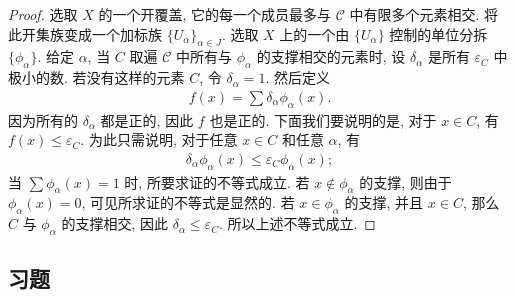 \documentclass[../../main.tex]{subfiles}
\begin{document}
\begin{proof}
选取 $X$ 的一个开覆盖, 它的每一个成员最多与 $\mathcal{C}$ 中有限多个元素相交. 将此开集族变成一个加标族 $\{U_\alpha\}_{\alpha\in J}$. 选取 $X$ 上的一个由 $\{U_\alpha\}$ 控制的单位分拆 $\{\phi_\alpha\}$. 给定 $\alpha$, 当 $C$ 取遍 $\mathcal{C}$ 中所有与 $\phi_\alpha$ 的支撑相交的元素时, 设 $\delta_\alpha$ 是所有 $\varepsilon_C$ 中极小的数. 若没有这样的元素 $C$, 令 $\delta_\alpha=1$. 然后定义
\begin{align*}
f(x)=\sum\delta_\alpha\phi_\alpha(x).
\end{align*}
因为所有的 $\delta_\alpha$ 都是正的, 因此 $f$ 也是正的. 下面我们要说明的是, 对于 $x\in C$, 有 $f(x)\leqslant\varepsilon_C$. 为此只需说明, 对于任意 $x\in C$ 和任意 $\alpha$, 有
\begin{align*}
\delta_\alpha\phi_\alpha(x)\leqslant\varepsilon_C\phi_\alpha(x);
\end{align*}
当 $\sum\phi_\alpha(x)=1$ 时, 所要求证的不等式成立. 若 $x\notin\phi_\alpha$ 的支撑, 则由于 $\phi_\alpha(x)=0$, 可见所求证的不等式是显然的. 若 $x\in\phi_\alpha$ 的支撑, 并且 $x\in C$, 那么 $C$ 与 $\phi_\alpha$ 的支撑相交, 因此 $\delta_\alpha\leqslant\varepsilon_C$. 所以上述不等式成立.
\end{proof}

\subsection*{习题}
\end{document}
